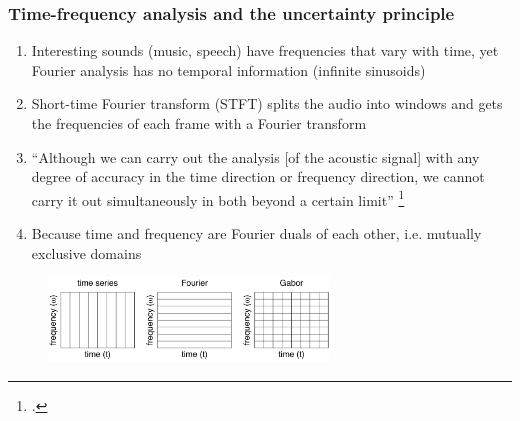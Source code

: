 \documentclass[usenames,dvipsnames]{beamer}
\begin{document}
\begin{frame}
	\frametitle{Time-frequency analysis and the uncertainty principle}
	\begin{enumerate}
		\item
			Interesting sounds (music, speech) have frequencies that vary with time, yet Fourier analysis has no temporal information (infinite sinusoids)
		\item
			Short-time Fourier transform (STFT) splits the audio into windows and gets the frequencies of each frame with a Fourier transform
		\item
			``Although we can carry out the analysis [of the acoustic signal] with any degree of accuracy in the time direction or frequency direction, we cannot carry it out simultaneously in both beyond a certain limit'' \footcite[432]{gabor1946}
		\item
			Because time and frequency are Fourier duals of each other, i.e. mutually exclusive domains

	\end{enumerate}
	\begin{figure}[ht]
		\centering
		\vspace{-0.75em}
		\includegraphics[width=7.5cm]{./images-tftheory/gabor3.png}
	\end{figure}
\end{frame}
\end{document}
